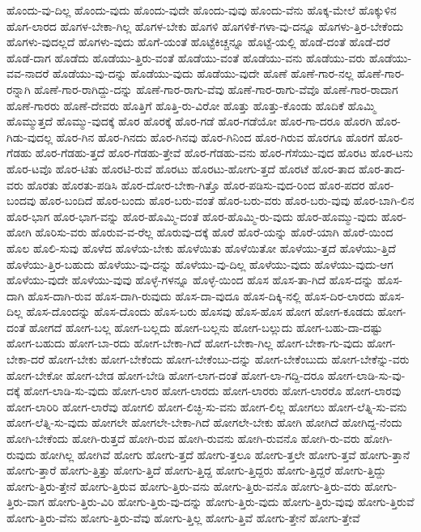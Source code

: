 {ಹೊಂದು-ವು-ದಿಲ್ಲ
ಹೊಂದು-ವುದು
ಹೊಂದು-ವುದೇ
ಹೊಂದು-ವುವು
ಹೊಂದು-ವೆನು
ಹೊಕ್ಕ-ಮೇಲೆ
ಹೊಕ್ಕುಳಿನ
ಹೊಗ-ಲಾರದ
ಹೊಗಳ-ಬೇಕಾ-ಗಿಲ್ಲ
ಹೊಗಳ-ಬೇಕು
ಹೊಗಳಿ
ಹೊಗಳಿಕೆ-ಗಳಾ-ವು-ದನ್ನೂ
ಹೊಗಳು-ತ್ತಿರ-ಬೇಕೆಂದು
ಹೊಗಳು-ವುದಲ್ಲದೆ
ಹೊಗಳು-ವುದು
ಹೊಗೆ-ಯಂತೆ
ಹೊಟ್ಟೆಕಿಚ್ಚನ್ನೂ
ಹೊಟ್ಟೆ-ಯಲ್ಲಿ
ಹೊಡೆ-ದಂತೆ
ಹೊಡೆ-ದರೆ
ಹೊಡೆ-ದಾಗ
ಹೊಡೆದು
ಹೊಡೆಯು-ತ್ತಿರು-ವಂತೆ
ಹೊಡೆಯು-ವಂತೆ
ಹೊಡೆಯು-ವನು
ಹೊಡೆಯು-ವರು
ಹೊಡೆಯು-ವವ-ನಾದರೆ
ಹೊಡೆಯು-ವು-ದನ್ನು
ಹೊಡೆಯು-ವುದು
ಹೊಡೆಯು-ವುದೇ
ಹೊಣೆ
ಹೊಣೆ-ಗಾರ-ನಲ್ಲ
ಹೊಣೆ-ಗಾರ-ರನ್ನಾಗಿ
ಹೊಣೆ-ಗಾರ-ರಾಗಿದ್ದು-ದನ್ನು
ಹೊಣೆ-ಗಾರ-ರಾಗು-ವೆವು
ಹೊಣೆ-ಗಾರ-ರಾಗು-ವೆವೊ
ಹೊಣೆ-ಗಾರ-ರಾದಾಗ
ಹೊಣೆ-ಗಾರರು
ಹೊಣೆ-ದೇವರು
ಹೊತ್ತಿಗೆ
ಹೊತ್ತಿ-ರು-ವಿರೋ
ಹೊತ್ತು
ಹೊತ್ತು-ಕೊಂಡು
ಹೊದಿಕೆ
ಹೊಮ್ಮಿ
ಹೊಮ್ಮುತ್ತದೆ
ಹೊಮ್ಮು-ವುದಕ್ಕೆ
ಹೊರ
ಹೊರಕ್ಕೆ
ಹೊರ-ಗಡೆ
ಹೊರ-ಗಡೆಯೋ
ಹೊರ-ಗಾ-ದರೂ
ಹೊರಗಿ
ಹೊರ-ಗಿಡು-ವುದಲ್ಲ
ಹೊರ-ಗಿನ
ಹೊರ-ಗಿನದು
ಹೊರ-ಗಿನವು
ಹೊರ-ಗಿನಿಂದ
ಹೊರ-ಗಿರುವ
ಹೊರಗೂ
ಹೊರಗೆ
ಹೊರ-ಗೆಡಹು
ಹೊರ-ಗೆಡಹು-ತ್ತದೆ
ಹೊರ-ಗೆಡಹು-ತ್ತೇವೆ
ಹೊರ-ಗೆಡಹು-ವನು
ಹೊರ-ಗೆಸೆಯು-ವುದ
ಹೊರಟ
ಹೊರ-ಟನು
ಹೊರ-ಟವೊ
ಹೊರ-ಟಿತು
ಹೊರಟಿ-ರುವೆ
ಹೊರಟು
ಹೊರಟು-ಹೋಗು-ತ್ತದೆ
ಹೊರಟೆ
ಹೊರ-ತಾದ
ಹೊರ-ತಾದ-ವರು
ಹೊರತು
ಹೊರತು-ಪಡಿಸಿ
ಹೊರ-ದೋರ-ಬೇಕಾ-ಗಿತ್ತೊ
ಹೊರ-ಪಡಿಸು-ವುದ-ರಿಂದ
ಹೊರ-ಪದರ
ಹೊರ-ಬಂದವು
ಹೊರ-ಬಂದಿದೆ
ಹೊರ-ಬಂದು
ಹೊರ-ಬರು-ವಂತೆ
ಹೊರ-ಬರು-ವರು
ಹೊರ-ಬರು-ವುವು
ಹೊರ-ಬಾಗಿ-ಲಿನ
ಹೊರ-ಭಾಗ
ಹೊರ-ಭಾಗ-ವನ್ನು
ಹೊರ-ಹೊಮ್ಮಿ-ದಂತೆ
ಹೊರ-ಹೊಮ್ಮಿ-ರು-ವುದು
ಹೊರ-ಹೊಮ್ಮು-ವುದು
ಹೊರ-ಹೋಗಿ
ಹೊರಿಸು-ವರು
ಹೊರುವ-ವ-ರೆಲ್ಲ
ಹೊರುವು-ದಕ್ಕೆ
ಹೊರೆ
ಹೊರೆ-ಯನ್ನು
ಹೊರೆ-ಯಾಗಿ
ಹೊರೆ-ಯಿಂದ
ಹೊಲ
ಹೊಲಿ-ಸುವು
ಹೊಳೆದ
ಹೊಳೆಯ-ಬೇಕು
ಹೊಳೆಯಿತು
ಹೊಳೆಯಿತೋ
ಹೊಳೆಯು-ತ್ತದೆ
ಹೊಳೆಯು-ತ್ತಿದೆ
ಹೊಳೆಯು-ತ್ತಿರ-ಬಹುದು
ಹೊಳೆಯು-ವು-ದನ್ನು
ಹೊಳೆಯು-ವು-ದಿಲ್ಲ
ಹೊಳೆಯು-ವುದು
ಹೊಳೆಯು-ವುದು-ಆಗ
ಹೊಳೆಯು-ವುದೇ
ಹೊಳೆಯು-ವುವು
ಹೊಳ್ಳೆ-ಗಳನ್ನೂ
ಹೊಳ್ಳೆ-ಯಿಂದ
ಹೊಸ
ಹೊಸ-ತಾ-ಗಿದೆ
ಹೊಸ-ದನ್ನು
ಹೊಸ-ದಾಗಿ
ಹೊಸ-ದಾಗಿ-ರುವ
ಹೊಸ-ದಾಗಿ-ರುವುದು
ಹೊಸ-ದಾ-ವುದೂ
ಹೊಸ-ದಿಕ್ಕಿ-ನಲ್ಲಿ
ಹೊಸ-ದಿರ-ಲಾರದು
ಹೊಸ-ದಿಲ್ಲ
ಹೊಸ-ದೊಂದನ್ನು
ಹೊಸ-ದೊಂದು
ಹೊಸ-ಬರು
ಹೊಸವು
ಹೊಸ-ಹೊಸ
ಹೋಗ
ಹೋಗ-ಕೂಡದು
ಹೋಗ-ದಂತೆ
ಹೋಗದೆ
ಹೋಗ-ಬಲ್ಲ
ಹೋಗ-ಬಲ್ಲದು
ಹೋಗ-ಬಲ್ಲನು
ಹೋಗ-ಬಲ್ಲುದು
ಹೋಗ-ಬಹು-ದಾ-ದಷ್ಟು
ಹೋಗ-ಬಹುದು
ಹೋಗ-ಬಾ-ರದು
ಹೋಗ-ಬೇಕಾ-ಗಿದೆ
ಹೋಗ-ಬೇಕಾ-ಗಿಲ್ಲ
ಹೋಗ-ಬೇಕಾ-ಗು-ವುದು
ಹೋಗ-ಬೇಕಾ-ದರೆ
ಹೋಗ-ಬೇಕು
ಹೋಗ-ಬೇಕೆಂದು
ಹೋಗ-ಬೇಕೆಂಬು-ದನ್ನು
ಹೋಗ-ಬೇಕೆಂಬುದು
ಹೋಗ-ಬೇಕೆನ್ನು-ವರು
ಹೋಗ-ಬೇಕೋ
ಹೋಗ-ಬೇಡ
ಹೋಗ-ಬೇಡಿ
ಹೋಗ-ಲಾಗ-ದಂತೆ
ಹೋಗ-ಲಾ-ಗದ್ದಿ-ದರೂ
ಹೋಗ-ಲಾಡಿ-ಸು-ವು-ದಕ್ಕೆ
ಹೋಗ-ಲಾಡಿ-ಸು-ವುದು
ಹೋಗ-ಲಾರ
ಹೋಗ-ಲಾರದು
ಹೋಗ-ಲಾರರು
ಹೋಗ-ಲಾರರೊ
ಹೋಗ-ಲಾರವು
ಹೋಗ-ಲಾರಿರಿ
ಹೋಗ-ಲಾರೆವು
ಹೋಗಲಿ
ಹೋಗ-ಲಿಚ್ಛಿ-ಸು-ವನು
ಹೋಗ-ಲಿಲ್ಲ
ಹೋಗಲು
ಹೋಗ-ಲೆತ್ನಿ-ಸು-ವನು
ಹೋಗ-ಲೆತ್ನಿ-ಸು-ವುದು
ಹೋಗಲೇ
ಹೋಗಲೇ-ಬೇಕಾ-ಗಿದೆ
ಹೋಗಲೇ-ಬೇಕು
ಹೋಗಿ
ಹೋಗಿದೆ
ಹೋಗಿದ್ದ-ನೆಂದು
ಹೋಗಿ-ಬೇಕೆಂದು
ಹೋಗಿ-ರುತ್ತದೆ
ಹೋಗಿ-ರುವ
ಹೋಗಿ-ರುವನು
ಹೋಗಿ-ರುವನೊ
ಹೋಗಿ-ರು-ವರು
ಹೋಗಿ-ರುವುದು
ಹೋಗಿಲ್ಲ
ಹೋಗಿವೆ
ಹೋಗು
ಹೋಗು-ತ್ತದೆ
ಹೋಗು-ತ್ತಲೂ
ಹೋಗು-ತ್ತಲೇ
ಹೋಗು-ತ್ತವೆ
ಹೋಗು-ತ್ತಾನೆ
ಹೋಗು-ತ್ತಾರೆ
ಹೋಗು-ತ್ತಿತ್ತು
ಹೋಗು-ತ್ತಿದೆ
ಹೋಗು-ತ್ತಿದ್ದ
ಹೋಗು-ತ್ತಿದ್ದರು
ಹೋಗು-ತ್ತಿದ್ದರೆ
ಹೋಗು-ತ್ತಿದ್ದು
ಹೋಗು-ತ್ತಿರು-ತ್ತೇನೆ
ಹೋಗು-ತ್ತಿರುವ
ಹೋಗು-ತ್ತಿರು-ವನು
ಹೋಗು-ತ್ತಿರು-ವನೊ
ಹೋಗು-ತ್ತಿರು-ವರು
ಹೋಗು-ತ್ತಿರು-ವಾಗ
ಹೋಗು-ತ್ತಿರು-ವಿರಿ
ಹೋಗು-ತ್ತಿರು-ವು-ದನ್ನು
ಹೋಗು-ತ್ತಿರು-ವುದು
ಹೋಗು-ತ್ತಿರು-ವುವು
ಹೋಗು-ತ್ತಿರುವೆ
ಹೋಗು-ತ್ತಿರು-ವೆನು
ಹೋಗು-ತ್ತಿರು-ವೆವು
ಹೋಗು-ತ್ತಿಲ್ಲ
ಹೋಗು-ತ್ತಿವೆ
ಹೋಗು-ತ್ತೇನೆ
ಹೋಗು-ತ್ತೇವೆ
}
